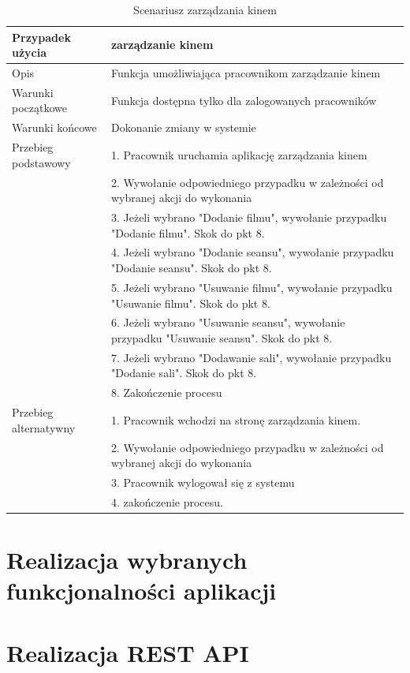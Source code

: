 \begin{table}[H]
	\begin{tabularx}{\textwidth}{ |l|X| }
		\hline 
		Przypadek użycia & zarządzanie kinem  \\ 
		\hline 
		Opis & Funkcja umożliwiająca pracownikom zarządzanie kinem \\ 
		\hline 
		Warunki początkowe & Funkcja dostępna tylko dla zalogowanych pracowników \\ 
		\hline 
		Warunki końcowe & Dokonanie zmiany w systemie  \\ 
		\hline 
		Przebieg podstawowy & 1. Pracownik uruchamia aplikację zarządzania kinem \\ 
		& 2. Wywołanie odpowiedniego przypadku w zależności od wybranej akcji do wykonania \\
		& 3. Jeżeli wybrano "Dodanie filmu", wywołanie przypadku "Dodanie filmu". Skok do pkt 8. \\
		& 4. Jeżeli wybrano "Dodanie seansu", wywołanie przypadku "Dodanie seansu". Skok do pkt 8. \\
		& 5. Jeżeli wybrano "Usuwanie filmu", wywołanie przypadku "Usuwanie filmu". Skok do pkt 8. \\
		& 6. Jeżeli wybrano "Usuwanie seansu", wywołanie przypadku "Usuwanie seansu". Skok do pkt 8. \\
		& 7. Jeżeli wybrano "Dodawanie sali", wywołanie przypadku "Dodanie sali". Skok do pkt 8. \\
		& 8. Zakończenie procesu \\
		\hline
		Przebieg alternatywny & 1. Pracownik wchodzi na stronę zarządzania kinem. \\
		& 2. Wywołanie odpowiedniego przypadku w zależności od wybranej akcji do wykonania \\
		& 3. Pracownik wylogował się z systemu \\
		& 4. zakończenie procesu. \\
		\hline 
	\end{tabularx} 
	\caption{Scenariusz zarządzania kinem}
	\label{tab:scen3}   
\end{table}

\section{Realizacja wybranych funkcjonalności aplikacji}
\lssetdef



\section{Realizacja REST API}

